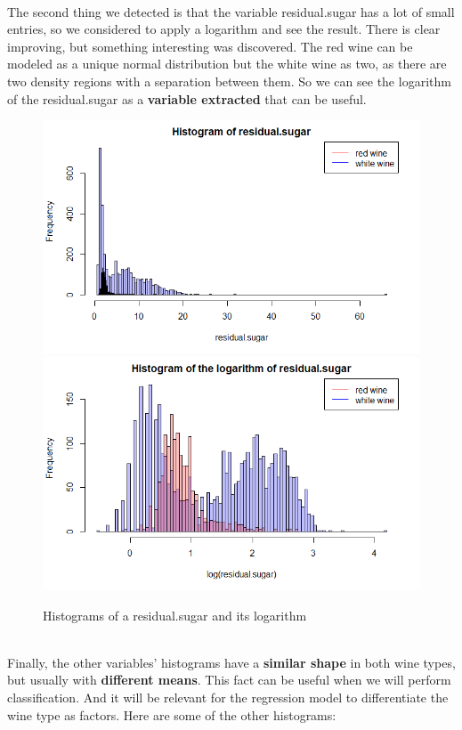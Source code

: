 \documentclass[10pt]{article}
\begin{document}
\ \\
The second thing we detected is that the variable residual.sugar has a lot of small entries, so we considered to apply a logarithm and see the result. There is clear improving, but something interesting was discovered. The red wine can be modeled as a unique normal distribution but the white wine as two, as there are two density regions with a separation between them. So we can see the logarithm of the residual.sugar as a \textbf{variable extracted} that can be useful.
\begin{figure}[H]
\centering
\caption{Histograms of a residual.sugar and its logarithm}
\includegraphics[scale=0.4]{histogram_of_residualsugar}
\includegraphics[scale=0.4]{histogram_of_log_residualsugar}
\end{figure}
\ \\
Finally, the other variables' histograms have a \textbf{similar shape} in both wine types, but usually with \textbf{different means}. This fact can be useful when we will perform classification. And it will be relevant for the regression model to differentiate the wine type as factors. Here are some of the other histograms: \\
\end{document}

